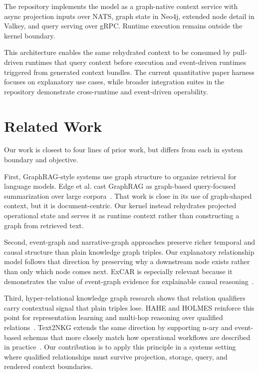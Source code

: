 \documentclass[11pt]{article}
\begin{document}
The repository implements the model as a graph-native context service with
async projection inputs over NATS, graph state in Neo4j, extended node detail
in Valkey, and query serving over gRPC. Runtime execution remains outside the
kernel boundary.

This architecture enables the same rehydrated context to be consumed by
pull-driven runtimes that query context before execution and event-driven
runtimes triggered from generated context bundles. The current quantitative
paper harness focuses on explanatory use cases, while broader integration
suites in the repository demonstrate cross-runtime and event-driven
operability.

\section{Related Work}

Our work is closest to four lines of prior work, but differs from each in
system boundary and objective.

First, GraphRAG-style systems use graph structure to organize retrieval for
language models. Edge et al. cast GraphRAG as graph-based query-focused
summarization over large corpora~\citep{edge2024localglobal}. That work is
close in its use of graph-shaped context, but it is document-centric. Our
kernel instead rehydrates projected operational state and serves it as runtime
context rather than constructing a graph from retrieved text.

Second, event-graph and narrative-graph approaches preserve richer temporal and
causal structure than plain knowledge graph triples. Our explanatory
relationship model follows that direction by preserving why a downstream node
exists rather than only which node comes next. ExCAR is especially relevant
because it demonstrates the value of event-graph evidence for explainable
causal reasoning~\citep{du2021excar}.

Third, hyper-relational knowledge graph research shows that relation qualifiers
carry contextual signal that plain triples lose. HAHE and HOLMES reinforce
this point for representation learning and multi-hop reasoning over qualified
relations~\citep{luo2023hahe,panda2024holmes}. Text2NKG extends the same
direction by supporting n-ary and event-based schemas that more closely match
how operational workflows are described in practice~\citep{luo2024text2nkg}.
Our contribution is to apply this principle in a systems setting where
qualified relationships must survive projection, storage, query, and rendered
context boundaries.
\end{document}

